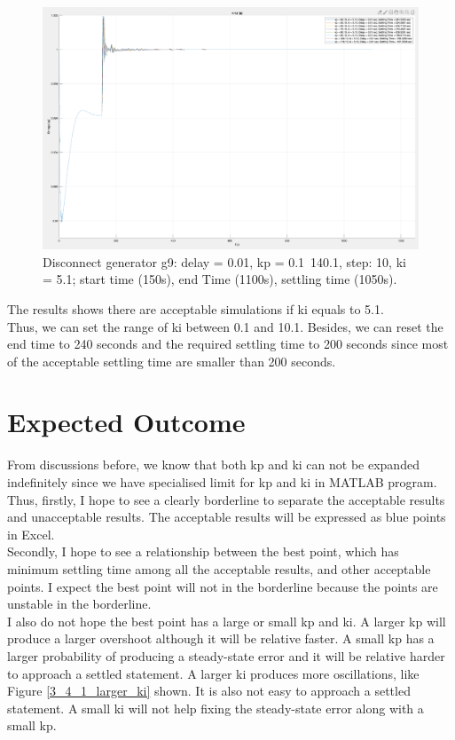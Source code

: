 \documentclass{report}
\begin{document}
\begin{figure}[htbp]
\centering
\includegraphics[width = .819\textwidth]{figure/4_1_2_c.png}
\caption{Disconnect generator g9: delay = 0.01, kp = 0.1~140.1, step: 10, ki = 5.1; start time (150s), end Time (1100s), settling time (1050s).}
\label{4_1_2_c}
\end{figure}

The results shows there are acceptable simulations if ki equals to 5.1. \\

Thus, we can set the range of ki between 0.1 and 10.1. 
Besides, we can reset the end time to 240 seconds and the required settling time to 200 seconds since most of the acceptable settling time are smaller than 200 seconds.\\

\section{Expected Outcome} %
\label{section4.2}
From discussions before, we know that both kp and ki can not be expanded indefinitely since we have specialised limit for kp and ki in MATLAB program. Thus, firstly, I hope to see a clearly borderline to separate the acceptable results and unacceptable results. The acceptable results will be expressed as blue points in Excel. \\

Secondly, I hope to see a relationship between the best point, which has minimum settling time among all the acceptable results, and other acceptable points. I expect the best point will not in the borderline because the points are unstable in the borderline. \\

I also do not hope the best point has a large or small kp and ki. A larger kp will produce a larger overshoot although it will be relative faster. A small kp has a larger probability of producing a steady-state error and it will be relative harder to approach a settled statement. A larger ki produces more oscillations, like Figure \textcolor{red}{\ref{3_4_1_larger_ki}} shown. It is also not easy to approach a settled statement. A small ki will not help fixing the steady-state error along with a small kp. \\
\end{document}
